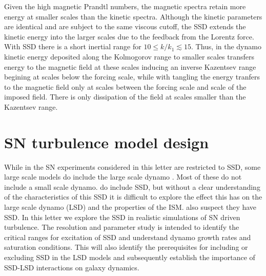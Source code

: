\documentclass[preprint2]{aastex63}
\begin{document}
Given the high magnetic Prandtl numbers, the magnetic spectra retain more energy
at smaller scales than the kinetic spectra.
Although the kinetic parameters are identical and are subject to the same 
viscous cutoff, the SSD extends the kinetic energy into the larger scales
due to the feedback from the Lorentz force.
With SSD there is a short inertial range for $10\leq k/k_1\lesssim 15$.
Thus, in the dynamo kinetic energy deposited along the Kolmogorov range to
smaller scales transfers energy to the magnetic field at these scales
inducing an inverse Kazentsev range begining at scales below the forcing
scale, while with tangling the energy tranfers to the magnetic field
only at scales between the forcing scale and scale of the imposed field.
There is only dissipation of the field at scales smaller than the Kazentsev 
range.


\section{SN turbulence model design} \label{sec:model}

While in the SN experiments considered in this letter are restricted to
SSD, some large scale models do include the large scale dynamo
\citep[e.g.,][]{Gressel:2008,HWK09,WA09,Gent:2013b,EGSFB16,Pakmor17,SBADMN19,SDLMBP20,GE20}.
Most of these do not include a small scale dynamo.
\citet{Gent:2013b,EGSFB16} do include SSD, but without a clear understanding of
the characteristics of this SSD it is difficult to explore the effect this has
on the large scale dynamo (LSD) and the properties of the ISM.
\citet{SBADMN19,SDLBMP20} also suspect they have SSD.
In this letter we explore the SSD in realistic simulations of SN driven 
turbulence.
The resolution and parameter study is intended to identify the critical ranges
for excitation of SSD and understand dynamo growth rates and saturation 
conditions.
This will also identify the prerequisites for including or excluding SSD in the
LSD models and subsequently establish the importance of SSD-LSD interactions 
on galaxy dynamics. 
\end{document}
